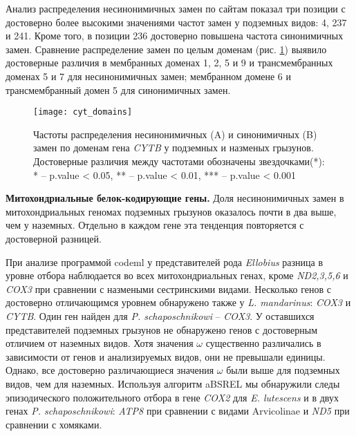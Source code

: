 Анализ распределения несинонимичных замен по сайтам показал три позиции с достоверно более высокими значениями частот замен у подземных видов: 4, 237 и 241. Кроме того, в позиции 236 достоверно повышена частота синонимичных замен. Сравнение распределение замен по целым доменам (рис. \ref{Cyt_Dom_fig}) выявило достоверные различия в мембранных доменах 1, 2, 5 и 9 и трансмембранных доменах 5 и 7 для несинонимичных замен; мембранном домене 6 и трансмембранный домен 5 для синонимичных замен.

\begin{figure}[h!]
	\begin{center}
		\texttt{[image: cyt\_domains]}
	\end{center}
	\caption{Частоты распределения несинонимичных (A) и синонимичных (B) замен по доменам гена \textit{CYTB} у подземных и назменых грызунов. Достоверные различия между частотами обозначены звездочками(*): * -- p.value < 0.05, ** -- p.value < 0.01, *** -- p.value < 0.001 }\label{Cyt_Dom_fig}
\end{figure} 

\textbf{Митохондриальные белок-кодирующие гены.} 
Доля несинонимичных замен в митохондриальных геномах подземных грызунов оказалось почти в два выше, чем у наземных. Отдельно в каждом гене эта тенденция повторяется с достоверной разницей.

При анализе программой codeml у представителей рода \textit{Ellobius} разница в уровне отбора наблюдается во всех митохондриальных генах, кроме \textit{ND2,3,5,6} и \textit{COX3} при сравнении с назмеными сестринскими видами. Несколько генов с достоверно отличающимся уровнем обнаружено также у \textit{L. mandarinus}: \textit{COX3} и \textit{CYTB}. Один ген найден для \textit{P. schaposchnikowi} -- \textit{COX3}. У оставшихся представителей подземных грызунов не обнаружено генов с достоверным отличием от наземных видов. Хотя значения $\omega$ существенно различались в зависимости от генов и анализируемых видов, они не превышали единицы. Однако, все достоверно различающиеся значения $\omega$ были выше для подземных видов, чем для наземных. Используя алгоритм aBSREL мы обнаружили следы эпизодического положительного отбора в гене \textit{COX2} для \textit{E. lutescens} и в двух генах \textit{P. schaposchnikowi}: \textit{ATP8} при сравнении с видами Arvicolinae и \textit{ND5} при сравнении с хомяками. 

